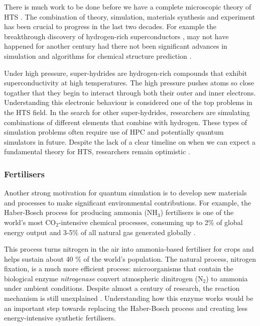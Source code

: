 \documentclass[10pt]{iopart}
\begin{document}
There is much work to be done before we have a complete microscopic theory of HTS \cite{Lilia2022,Zhou2021}. The combination of theory, simulation, materials synthesis and experiment has been crucial to progress in the last two decades. For example the breakthrough discovery of hydrogen-rich superconductors \cite{Drozdov2015}, may not have happened for another century \cite{Castelvecchi2023s} had there not been significant advances in simulation and algorithms for chemical structure prediction \cite{Li2014}. 

Under high pressure, super-hydrides are hydrogen-rich compounds that exhibit superconductivity at high temperatures. The high pressure pushes atoms so close togather that they begin to interact through both their outer and inner electrons. Understanding this electronic behaviour is considered one of the top problems in the HTS field. In the search for other super-hydrides, researchers are simulating combinations of different elements that combine with hydrogen. These types of simulation problems often require use of HPC and potentially quantum simulators in future. Despite the lack of a clear timeline on when we can expect a fundamental theory for HTS, researchers remain optimistic \cite{Castelvecchi2023s}. 


\subsubsection{Fertilisers}\hfill 

Another strong motivation for quantum simulation is to develop new materials and processes to make significant environmental contributions. For example, the Haber-Bosch process for producing ammonia (NH$_3$) fertilisers is one of the world's most CO$_2$-intensive chemical processes, consuming up to 2\% of global energy output \cite{Reiher2017} and 3-5\% of all natural gas generated globally \cite{BCG2020}. 

This process turns nitrogen in the air into ammonia-based fertiliser for crops and helps sustain about 40 \% of the world's population. The natural process, nitrogen fixation, is a much more efficient process: microorganisms that contain the biological enzyme \textit{nitrogenase} convert atmospheric dinitrogen (N$_2$) to ammonia under ambient conditions. Despite almost a century of research, the reaction mechanism is still unexplained \cite{Burgess1996,Vogiatzis2019}. Understanding how this enzyme works would be an important step towards replacing the Haber-Bosch process and creating less energy-intensive synthetic fertilisers.
\end{document}
